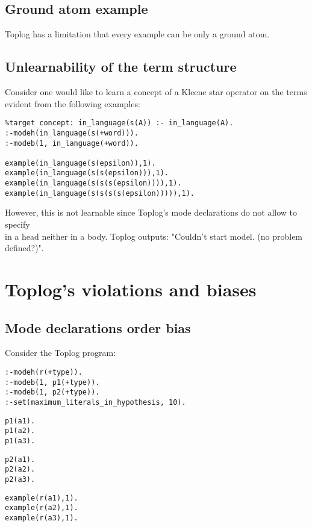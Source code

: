 \subsection{Ground atom example}
Toplog has a limitation that every example can be only a ground atom.

\subsection{Unlearnability of the term structure}
Consider one would like to learn a concept of a Kleene star operator on the terms evident from the following examples:
\begin{lstlisting}
%target concept: in_language(s(A)) :- in_language(A).
:-modeh(in_language(s(+word))).
:-modeb(1, in_language(+word)).

example(in_language(s(epsilon)),1).
example(in_language(s(s(epsilon))),1).
example(in_language(s(s(s(epsilon)))),1).
example(in_language(s(s(s(s(epsilon))))),1).
\end{lstlisting}

However, this is not learnable since Toplog's mode declarations do not allow to specify\\
 in a head neither in a body. Toplog outputs:
"Couldn't start model. (no problem defined?)".


\section{Toplog's violations and biases}
\subsection{Mode declarations order bias}
Consider the Toplog program:

\begin{minipage}[t]{.35\textwidth}
\begin{lstlisting}
:-modeh(r(+type)).
:-modeb(1, p1(+type)).
:-modeb(1, p2(+type)).
:-set(maximum_literals_in_hypothesis, 10).
\end{lstlisting}
\end{minipage}
\begin{minipage}[t]{.20\textwidth}
\begin{lstlisting}
p1(a1).
p1(a2).
p1(a3).
\end{lstlisting}
\end{minipage}
\begin{minipage}[t]{.20\textwidth}
\begin{lstlisting}
p2(a1).
p2(a2).
p2(a3).
\end{lstlisting}
\end{minipage}
\begin{minipage}[t]{.25\textwidth}
\begin{lstlisting}
example(r(a1),1).
example(r(a2),1).
example(r(a3),1).
\end{lstlisting}
\end{minipage}


